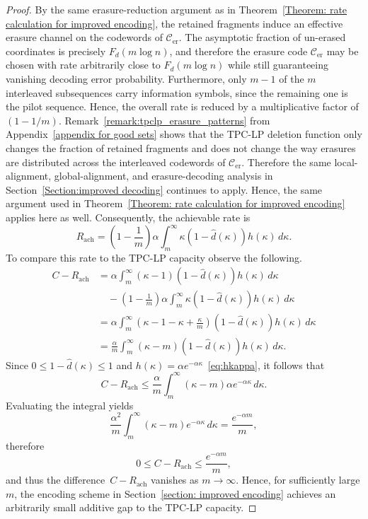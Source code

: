 \documentclass[journal,letterpaper,onecolumn,11pt]{IEEEtran}
\newcommand{\cC}{\mathcal{C}}
\begin{document}
\begin{proof}
By the same erasure-reduction argument as in
Theorem~\ref{Theorem: rate calculation for improved encoding}, the retained fragments induce an effective erasure channel on the codewords of
$\cC_{\mathrm{er}}$. 
The asymptotic fraction of un-erased coordinates is
precisely $F_d(m\log n)$, and therefore the erasure code
$\cC_{\mathrm{er}}$ may be chosen with rate arbitrarily close to
$F_d(m\log n)$ while still guaranteeing vanishing decoding error
probability.
Furthermore, only $m-1$ of the $m$ interleaved subsequences
carry information symbols, since the remaining one is
the pilot sequence. 
Hence, the overall rate is reduced by a multiplicative
factor of $(1-1/m)$. 
Remark~\ref{remark:tpclp_erasure_patterns} from
Appendix~\ref{appendix for good sets} shows that the TPC-LP deletion function
only changes the fraction of retained fragments and does not change the way
erasures are distributed across the interleaved codewords of $\mathcal{C}_{\mathrm{er}}$. 
Therefore the same local-alignment, global-alignment, and erasure-decoding analysis in Section~\ref{Section:improved decoding} continues to apply.
Hence, the same argument used in Theorem~\ref{Theorem: rate calculation for improved encoding}
applies here as well.
Consequently, the achievable rate is
\[
    R_{\mathrm{ach}}
    =
    \left(1-\frac{1}{m}\right)
    \alpha
    \int_{m}^{\infty}
    \kappa(1-\hat d(\kappa))h(\kappa)\,d\kappa.
\]
To compare this rate to the TPC-LP capacity observe the following. 
\begin{align*}
    C-R_{\mathrm{ach}}
    &=
    \alpha\int_m^\infty
    (\kappa-1)(1-\hat d(\kappa))h(\kappa)\,d\kappa \\
    &\quad -
    \left(1-\frac{1}{m}\right)
    \alpha\int_m^\infty
    \kappa(1-\hat d(\kappa))h(\kappa)\,d\kappa \\
    &=
    \alpha\int_m^\infty
    \left(\kappa-1-\kappa+\frac{\kappa}{m}\right)
    (1-\hat d(\kappa))h(\kappa)\,d\kappa \\
    &=
    \frac{\alpha}{m}
    \int_m^\infty
    (\kappa-m)(1-\hat d(\kappa))h(\kappa)\,d\kappa.
\end{align*}
Since $0\le 1-\hat d(\kappa)\le 1$ and $h(\kappa)=\alpha e^{-\alpha\kappa}$~\eqref{eq:hkappa}, it follows that
\[
    C-R_{\mathrm{ach}}
    \le
    \frac{\alpha}{m}
    \int_m^\infty
    (\kappa-m)\alpha e^{-\alpha\kappa}\,d\kappa.
\]
Evaluating the integral yields
\[
    \frac{\alpha^2}{m}
    \int_m^\infty
    (\kappa-m)e^{-\alpha\kappa}\,d\kappa
    =
    \frac{e^{-\alpha m}}{m},
\]
therefore
\[
    0\le C-R_{\mathrm{ach}}
    \le
    \frac{e^{-\alpha m}}{m},
\]
and thus the difference~$C-R_\text{ach}$ vanishes as $m\to\infty$. 
Hence, for sufficiently large
$m$, the encoding scheme in Section~\ref{section: improved encoding} achieves
an arbitrarily small additive gap to the TPC-LP capacity.
\end{proof}
\end{document}
